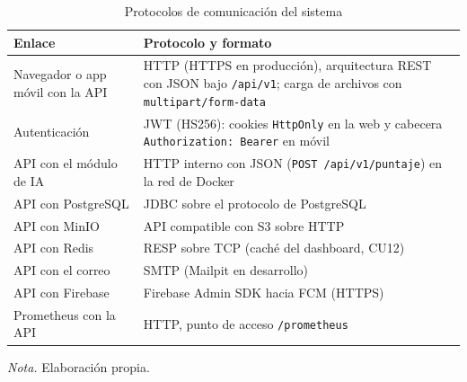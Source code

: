 \label{sec:cap8_protocolos}

\begin{table}[H]
\caption{Protocolos de comunicación del sistema}
\label{tab:impl_protocolos}
\centering
\footnotesize\linespread{1}\selectfont
\renewcommand{\arraystretch}{1.3}
\begin{tabular}{>{\raggedright\arraybackslash}p{5cm}>{\raggedright\arraybackslash}p{10cm}}
\toprule
\textbf{Enlace} & \textbf{Protocolo y formato} \\
\midrule
Navegador o app móvil con la API & HTTP (HTTPS en producción), arquitectura REST con JSON bajo \texttt{/api/v1}; carga de archivos con \texttt{multipart/form-data} \\
Autenticación & JWT (HS256): cookies \texttt{HttpOnly} en la web y cabecera \texttt{Authorization: Bearer} en móvil \\
API con el módulo de IA & HTTP interno con JSON (\texttt{POST /api/v1/puntaje}) en la red de Docker \\
API con PostgreSQL & JDBC sobre el protocolo de PostgreSQL \\
API con MinIO & API compatible con S3 sobre HTTP \\
API con Redis & RESP sobre TCP (caché del dashboard, CU12) \\
API con el correo & SMTP (Mailpit en desarrollo) \\
API con Firebase & Firebase Admin SDK hacia FCM (HTTPS) \\
Prometheus con la API & HTTP, punto de acceso \texttt{/prometheus} \\
\bottomrule
\end{tabular}

\smallskip
\noindent\raggedright\textit{Nota.} Elaboración propia.
\end{table}


